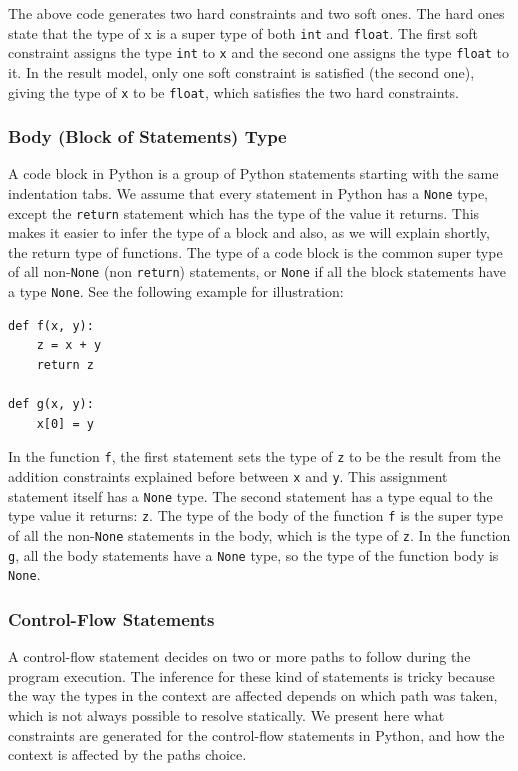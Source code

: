 The above code generates two hard constraints and two soft ones. The hard ones state that the type of x is a super type of both \lstinline|int| and \lstinline|float|. The first soft constraint assigns the type \lstinline|int| to \lstinline|x| and the second one assigns the type \lstinline|float| to it. In the result model, only one soft constraint is satisfied (the second one), giving the type of \lstinline|x| to be \lstinline|float|, which satisfies the two hard constraints.

\subsubsection{Body (Block of Statements) Type}
A code block in Python is a group of Python statements starting with the same indentation tabs. We assume that every statement in Python has a \lstinline|None| type, except the \lstinline|return| statement which has the type of the value it returns. This makes it easier to infer the type of a block and also, as we will explain shortly, the return type of functions. The type of a code block is the common super type of all non-\lstinline|None| (non \lstinline|return|) statements, or \lstinline|None| if all the block statements have a type \lstinline|None|. See the following example for illustration:
\begin{lstlisting}
def f(x, y):
	z = x + y
	return z
	
def g(x, y):
	x[0] = y
\end{lstlisting}
In the function \lstinline|f|, the first statement sets the type of \lstinline|z| to be the result from the addition constraints explained before between \lstinline|x| and \lstinline|y|. This assignment statement itself has a \lstinline|None| type. The second statement has a type equal to the type value it returns: \lstinline|z|. The type of the body of the function \lstinline|f| is the super type of all the non-\lstinline|None| statements in the body, which is the type of \lstinline|z|. In the function \lstinline|g|, all the body statements have a \lstinline|None| type, so the type of the function body is \lstinline|None|.

\subsubsection{Control-Flow Statements}
A control-flow statement decides on two or more paths to follow during the program execution. The inference for these kind of statements is tricky because the way the types in the context are affected depends on which path was taken, which is not always possible to resolve statically. We present here what constraints are generated for the control-flow statements in Python, and how the context is affected by the paths choice. \\

